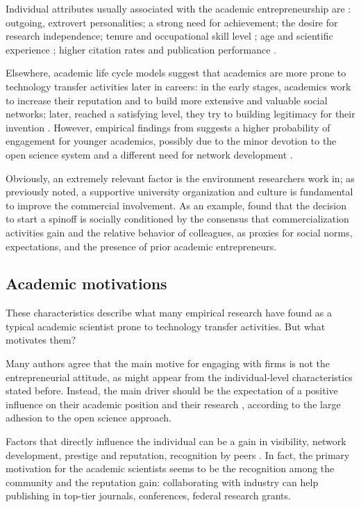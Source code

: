Individual attributes usually associated with the academic entrepreneurship are \citep{OShea2004}: outgoing, extrovert personalities; a strong need for achievement; the desire for research independence; tenure and occupational skill level \citep{Roberts1991}; age and scientific experience \citep{Audretsch2000}; higher citation rates and publication performance \citep{Zucker2001}.

Elsewhere, academic life cycle models suggest that academics are more prone to technology transfer activities later in careers: in the early stages, academics work to increase their reputation and to build more extensive and valuable social networks; later, reached a satisfying level, they try to building legitimacy for their invention \citet{Fini2009}. However, empirical findings from \citet{DEste2007} suggests a higher probability of engagement for younger academics, possibly due to the minor devotion to the open science system and a different need for network development \citep{Bercovitz2006}.

Obviously, an extremely relevant factor is the environment researchers work in; as previously noted, a supportive university organization and culture is fundamental to improve the commercial involvement. As an example, \citet{OShea2004} found that the decision to start a spinoff is socially conditioned by the consensus that commercialization activities gain and the relative behavior of colleagues, as proxies for social norms, expectations, and the presence of prior academic entrepreneurs. 

\subsection{Academic motivations}

These characteristics describe what many empirical research have found as a typical academic scientist prone to technology transfer activities. But what motivates them? 

Many authors agree that the main motive for engaging with firms is not the entrepreneurial attitude, as might appear from the individual-level characteristics stated before. Instead, the main driver should be the expectation of a positive influence on their academic position and their research \citep{Fini2009, DEste2011}, according to the large adhesion to the open science approach.

Factors that directly influence the individual can be a gain in visibility, network development, prestige and reputation, recognition by peers \citep{Baldini2007, Fini2009, Rizzo2015}. In fact, the primary motivation for the academic scientists seems to be the recognition among the community and the reputation gain: collaborating with industry can help publishing in top-tier journals, conferences, federal research grants.

